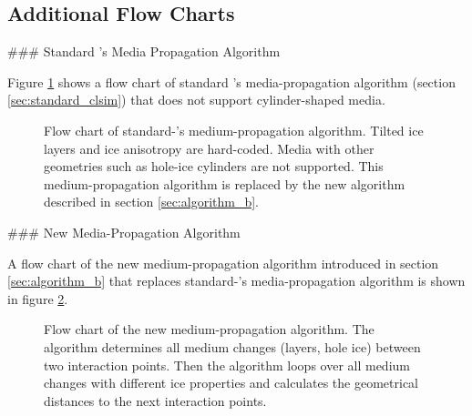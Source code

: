 
\subsection{Additional Flow Charts}
\label{sec:flow_charts}

### Standard \clsim's Media Propagation Algorithm

Figure \ref{fig:rieQu7sh} shows a flow chart of standard \clsim's media-propagation algorithm (section \ref{sec:standard_clsim}) that does not support cylinder-shaped media.

\begin{figure}[htbp]
  \caption{Flow chart of standard-\clsim's medium-propagation algorithm. Tilted ice layers and ice anisotropy are hard-coded. Media with other geometries such as hole-ice cylinders are not supported. This medium-propagation algorithm is replaced by the new algorithm described in section \ref{sec:algorithm_b}.}
  \label{fig:rieQu7sh}
\end{figure}

\newpage
### New Media-Propagation Algorithm

A flow chart of the new medium-propagation algorithm introduced in section \ref{sec:algorithm_b} that replaces standard-\clsim's media-propagation algorithm is shown in figure \ref{fig:iez4Geih}.

\begin{figure}[htbp]
  \caption{Flow chart of the new medium-propagation algorithm. The algorithm determines all medium changes (layers, hole ice) between two interaction points. Then the algorithm loops over all medium changes with different ice properties and calculates the geometrical distances to the next interaction points.}
  \label{fig:iez4Geih}
\end{figure}
